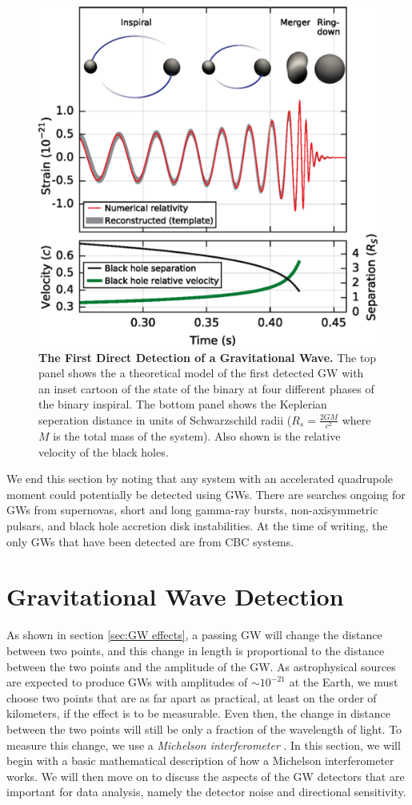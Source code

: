 \documentclass[11pt]{cuthesis}
\begin{document}
\begin{figure}[ht]
\centering
\includegraphics[width=12cm]{150914signal.png} 
\caption{\textbf{The First Direct Detection of a Gravitational Wave.} The top panel shows the a theoretical model of the first detected GW with an inset cartoon of the state of the binary at four different phases of the binary inspiral. The bottom panel shows the Keplerian seperation distance in units of Schwarzschild radii ($R_s=\frac{2GM}{c^2}$ where $M$ is the total mass of the system). Also shown is the relative velocity of the black holes.  \cite{150914-det-paper} }
\label{fig:150914 signal}
\end{figure}

We end this section by noting that any system with an accelerated quadrupole moment could potentially be detected using GWs. There are searches ongoing for GWs from supernovas, short and long gamma-ray bursts, non-axisymmetric pulsars, and black hole accretion disk instabilities. At the time of writing, the only GWs that have been detected are from CBC systems.  

\section{Gravitational Wave Detection} \label{sec:gw detectors}
As shown in section \ref{sec:GW effects}, a passing GW will change the distance between two points, and this change in length is proportional to the distance between the two points and the amplitude of the GW. As astrophysical sources are expected to produce GWs with amplitudes of $\sim 10^{-21}$ at the Earth, we must choose two points that are as far apart as practical, at least on the order of kilometers, if the effect is to be measurable. Even then, the change in distance between the two points will still be only a fraction of the wavelength of light. To measure this change, we use a \textit{Michelson interferometer} \cite{weiss72}. In this section, we will begin with a basic mathematical description of how a Michelson interferometer works. We will then move on to discuss the aspects of the GW detectors that are important for data analysis, namely the detector noise and directional sensitivity.
\end{document}
